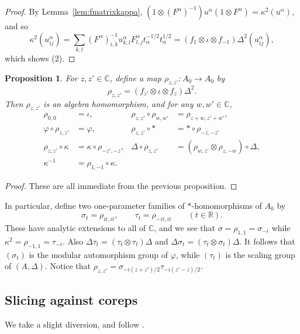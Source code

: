 \documentclass[twoside,a4paper,12pt]{article}
\theoremstyle{plain}
\newtheorem{proposition}{Proposition}[section]
\theoremstyle{definition}
\begin{document}
\begin{proof}
By Lemma~\ref{lem:fmatrixkappa}, $(1\otimes (F^\alpha)^{-1})u^\alpha
(1\otimes F^\alpha) = \kappa^2(u^\alpha)$, and so
\[ \kappa^2(u^\alpha_{ij})
= \sum_{k,l} (F^\alpha)^{-1}_{i,k} u^\alpha_{k,l}
F^\alpha_{l,j} t_\alpha^{-1/2} t_\alpha^{1/2}
= (f_1 \otimes \iota \otimes f_{-1})\Delta^2(u^\alpha_{ij}), \]
which shows (2).
\end{proof}

\begin{proposition}
For $z,z'\in\mathbb C$, define a map $\rho_{z,z'}:A_0\rightarrow A_0$ by
\[ \rho_{z,z'} = (f_{z'}\otimes\iota\otimes f_z)\Delta^2. \]
Then $\rho_{z,z'}$ is an algebra homomorphism, and for any $w,w'\in\mathbb C$,
\begin{align*}
\rho_{0,0}&=\iota, & \rho_{z,z'}\circ\rho_{w,w'}&=\rho_{z+w,z'+w'}, \\
\varphi\circ\rho_{z,z'} &= \varphi,  &  \rho_{z,z'}\circ *
  &= *\circ\rho_{-\overline z,-\overline z'} \\
\rho_{z,z'}\circ \kappa &= \kappa\circ\rho_{-z',-z},  &
  \Delta\circ\rho_{z,z'} &= (\rho_{w,z'} \otimes \rho_{z,-w})\circ\Delta, \\
\kappa^{-1} &= \rho_{1,-1}\circ\kappa.
\end{align*}
\end{proposition}
\begin{proof}
These are all immediate from the previous proposition.
\end{proof}

In particular, define two one-parameter families of $*$-homomorphisms of
$A_0$ by
\[ \sigma_t = \rho_{it,it}, \qquad \tau_t = \rho_{-it,it}
\qquad (t\in\mathbb R). \]
These have analytic extensions to all of $\mathbb C$, and we see that
$\sigma = \rho_{1,1} = \sigma_{-i}$ while $\kappa^2 = \rho_{-1,1}
= \tau_{-i}$.  Also $\Delta\tau_t = (\tau_t\otimes\tau_t)\Delta$ and
$\Delta\sigma_t = (\tau_t\otimes\sigma_t)\Delta$.  It follows that
$(\sigma_t)$ is the modular automorphism group of $\varphi$, while
$(\tau_t)$ is the scaling group of $(A,\Delta)$.  Notice that
$\rho_{z,z'} = \sigma_{-i(z+z')/2} \tau_{-i(z'-z)/2}$.




\subsection{Slicing against coreps}

We take a slight diversion, and follow \cite[Section~4]{woro2}.
\end{document}
